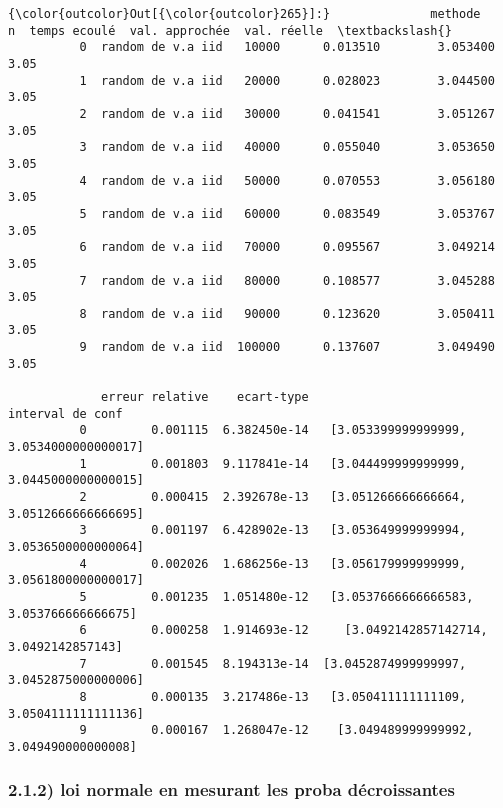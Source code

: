 \documentclass[11pt]{article}
\begin{document}
            \begin{Verbatim}[commandchars=\\\{\}]
{\color{outcolor}Out[{\color{outcolor}265}]:}              methode       n  temps ecoulé  val. approchée  val. réelle  \textbackslash{}
          0  random de v.a iid   10000      0.013510        3.053400         3.05   
          1  random de v.a iid   20000      0.028023        3.044500         3.05   
          2  random de v.a iid   30000      0.041541        3.051267         3.05   
          3  random de v.a iid   40000      0.055040        3.053650         3.05   
          4  random de v.a iid   50000      0.070553        3.056180         3.05   
          5  random de v.a iid   60000      0.083549        3.053767         3.05   
          6  random de v.a iid   70000      0.095567        3.049214         3.05   
          7  random de v.a iid   80000      0.108577        3.045288         3.05   
          8  random de v.a iid   90000      0.123620        3.050411         3.05   
          9  random de v.a iid  100000      0.137607        3.049490         3.05   
          
             erreur relative    ecart-type                          interval de conf  
          0         0.001115  6.382450e-14   [3.053399999999999, 3.0534000000000017]  
          1         0.001803  9.117841e-14   [3.044499999999999, 3.0445000000000015]  
          2         0.000415  2.392678e-13   [3.051266666666664, 3.0512666666666695]  
          3         0.001197  6.428902e-13   [3.053649999999994, 3.0536500000000064]  
          4         0.002026  1.686256e-13   [3.056179999999999, 3.0561800000000017]  
          5         0.001235  1.051480e-12   [3.0537666666666583, 3.053766666666675]  
          6         0.000258  1.914693e-12     [3.0492142857142714, 3.0492142857143]  
          7         0.001545  8.194313e-14  [3.0452874999999997, 3.0452875000000006]  
          8         0.000135  3.217486e-13   [3.050411111111109, 3.0504111111111136]  
          9         0.000167  1.268047e-12    [3.049489999999992, 3.049490000000008]  
\end{Verbatim}
        
    \subsubsection{2.1.2) loi normale en mesurant les proba
décroissantes}\label{loi-normale-en-mesurant-les-proba-duxe9croissantes}
\end{document}
